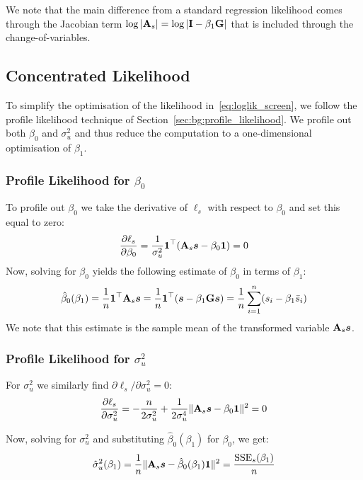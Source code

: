 We note that the main difference from a standard regression likelihood comes through the Jacobian term $\log|\mathbf{A}_s| = \log|\mathbf{I} - \beta_1\mathbf{G}|$ that is included through the change-of-variables.

\subsection{Concentrated Likelihood}

To simplify the optimisation of the likelihood in~\eqref{eq:loglik_screen}, we follow the profile likelihood technique of Section~\ref{sec:bg:profile_likelihood}. We profile out both $\beta_0$ and $\sigma_u^2$ and thus reduce the computation to a one-dimensional optimisation of $\beta_1$.

\subsubsection{Profile Likelihood for $\beta_0$}

To profile out $\beta_0$ we take the derivative of $\ell_s$ with respect to $\beta_0$ and set this equal to zero:
\begin{equation}
    \frac{\partial \ell_s}{\partial \beta_0} =
    \frac{1}{\sigma_u^2}\bm{1}^\top(\mathbf{A}_s\bm{s} - \beta_0\bm{1}) = 0
\end{equation}
Now, solving for $\beta_0$ yields the following estimate of $\beta_0$ in terms of $\beta_1$:
\begin{equation}
\label{eq:beta0_profile}
    \hat\beta_0(\beta_1) = \frac{1}{n}\bm{1}^\top\mathbf{A}_s\bm{s}
    = \frac{1}{n}\bm{1}^\top(\bm{s} - \beta_1\mathbf{G}\bm{s})
    = \frac{1}{n}\sum_{i=1}^n (s_i - \beta_1\bar{s}_i)
\end{equation}
We note that this estimate is the sample mean of the transformed variable $\mathbf{A}_s\bm{s}$.

\subsubsection{Profile Likelihood for $\sigma_u^2$}

For $\sigma_u^2$ we similarly find $\partial \ell_s / \partial \sigma_u^2 = 0$:
\begin{equation}
    \frac{\partial \ell_s}{\partial \sigma_u^2} =
    -\frac{n}{2\sigma_u^2} + \frac{1}{2\sigma_u^4}\|\mathbf{A}_s\bm{s} - \beta_0\bm{1}\|^2 = 0
\end{equation}

Now, solving for $\sigma_u^2$ and substituting $\hat\beta_0(\beta_1)$ for $\beta_0$, we get:
\begin{equation}
    \hat\sigma_u^2(\beta_1) = \frac{1}{n}\|\mathbf{A}_s\bm{s} - \hat\beta_0(\beta_1)\bm{1}\|^2
    = \frac{\text{SSE}_s(\beta_1)}{n}
\end{equation}

